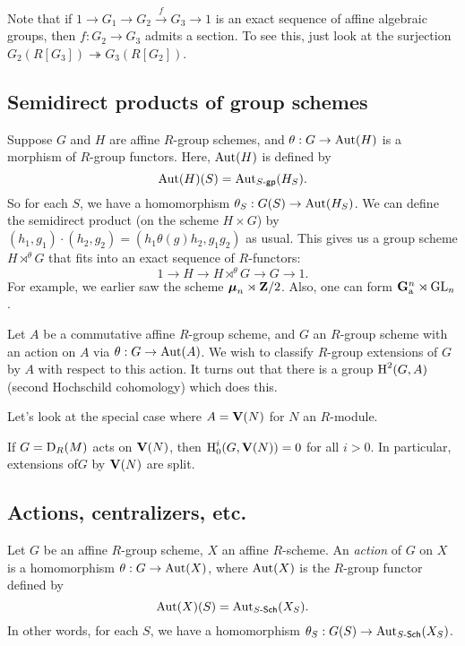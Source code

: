 \documentclass{article}
\begin{document}
Note that if $1 \to G_1 \to G_2 \xrightarrow f G_3 \to 1$ is an exact 
sequence of affine algebraic groups, then $f:G_2 \to G_3$ admits a section. 
To see this, just look at the surjection 
$G_2(R[G_3]) \twoheadrightarrow G_3(R[G_2])$. 


\subsection{Semidirect products of group schemes}

Suppose $G$ and $H$ are affine $R$-group schemes, and 
$\theta:G\to \operatorname{Aut}(H)$ is a morphism of $R$-group functors. Here, 
$\operatorname{Aut}(H)$ is defined by 
\[
  \operatorname{Aut}(H)(S) = \operatorname{Aut}_{S\textnormal{-}\mathsf{gp}}(H_S) .
\]
So for each $S$, we have a homomorphism 
$\theta_S:G(S) \to \operatorname{Aut}(H_S)$. We can define the semidirect product 
(on the scheme $H\times G$) by 
$(h_1,g_1) \cdot (h_2,g_2) = (h_1 \theta(g) h_2, g_1 g_2)$ as usual. This 
gives us a group scheme $H\rtimes^\theta G$ that fits into an exact sequence of 
$R$-functors:
\[
  1 \to H \to H\rtimes^\theta G \to G \to 1 .
\]
For example, we earlier saw the scheme $\boldsymbol\mu_n\rtimes \mathbf{Z}/2$. Also, 
one can form $\mathbf{G}_{\mathrm{a}}^n\rtimes \operatorname{GL}_n$. 

Let $A$ be a commutative affine $R$-group scheme, and $G$ an $R$-group scheme 
with an action on $A$ via $\theta:G\to \operatorname{Aut}(A)$. We wish to classify 
$R$-group extensions of $G$ by $A$ with respect to this action. It turns out 
that there is a group $\operatorname{H}^2(G,A)$ (second Hochschild cohomology) which does this. 

Let's look at the special case where $A=\mathbf{V}(N)$ for $N$ an $R$-module. 

\begin{theorem}[Grothendieck]
If $G=\operatorname{D}_R(M)$ acts on $\mathbf{V}(N)$, then $\operatorname{H}_0^i(G,\mathbf{V}(N))=0$ for all 
$i>0$. In particular, extensions of$G$ by $\mathbf{V}(N)$ are split. 
\end{theorem}


\subsection{Actions, centralizers, etc.}

Let $G$ be an affine $R$-group scheme, $X$ an affine $R$-scheme. An 
\emph{action} of $G$ on $X$ is a homomorphism 
$\theta:G\to \operatorname{Aut}(X)$, where $\operatorname{Aut}(X)$ is the $R$-group 
functor defined by 
\[
  \operatorname{Aut}(X)(S) = \operatorname{Aut}_{S\textnormal{-}\mathsf{Sch}}(X_S) .
\]
In other words, for each $S$, we have a homomorphism 
$\theta_S:G(S) \to \operatorname{Aut}_{S\textnormal{-}\mathsf{Sch}}(X_S)$. 
\end{document}

